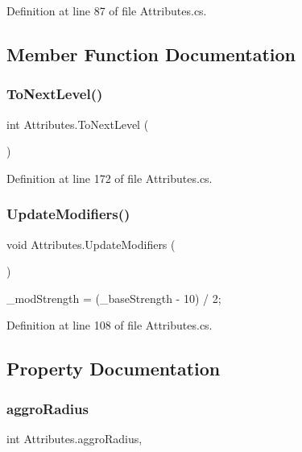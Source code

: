 Definition at line 87 of file Attributes.\+cs.



\subsection{Member Function Documentation}
\mbox{\label{class_attributes_a413dfd410d573f7200c07ce9872598fb}} 
\subsubsection{\texorpdfstring{ToNextLevel()}{ToNextLevel()}}
{\footnotesize\ttfamily int Attributes.\+To\+Next\+Level (\begin{DoxyParamCaption}{ }\end{DoxyParamCaption})}



Definition at line 172 of file Attributes.\+cs.

\mbox{\label{class_attributes_a73fffc9279e2b2307003d347485ff77b}} 
\subsubsection{\texorpdfstring{UpdateModifiers()}{UpdateModifiers()}}
{\footnotesize\ttfamily void Attributes.\+Update\+Modifiers (\begin{DoxyParamCaption}{ }\end{DoxyParamCaption})}

\+\_\+mod\+Strength = (\+\_\+base\+Strength -\/ 10) / 2; 

Definition at line 108 of file Attributes.\+cs.



\subsection{Property Documentation}
\mbox{\label{class_attributes_aeb2c4d8fb766486fb2302a8e196594a3}} 
\subsubsection{\texorpdfstring{aggroRadius}{aggroRadius}}
{\footnotesize\ttfamily int Attributes.\+aggro\+Radius\hspace{0.3cm}{\ttfamily [get]}, {\ttfamily [set]}}



